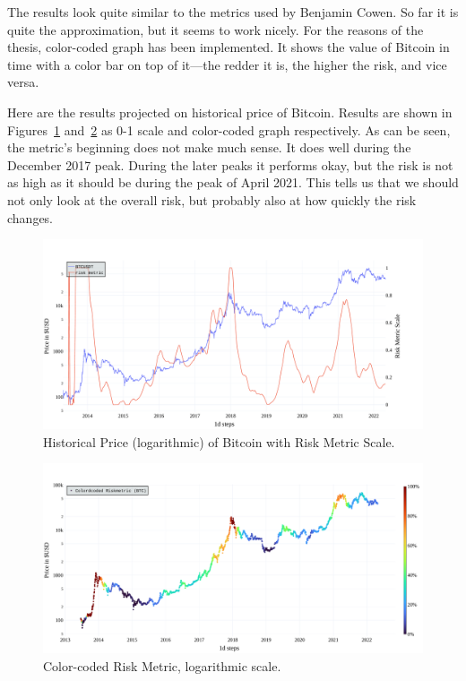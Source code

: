 The results look quite similar to the metrics used by Benjamin Cowen. So far it is quite the approximation, but it seems to work nicely. For the reasons of the thesis, color-coded graph has been implemented. It shows the value of Bitcoin in time with a color bar on top of it---the redder it is, the higher the risk, and vice versa.

Here are the results projected on historical price of Bitcoin. Results are shown in Figures~\ref{figure-50week-scale} and~\ref{figure-50week-colorcoded} as 0-1 scale and color-coded graph respectively. As can be seen, the metric's beginning does not make much sense. It does well during the December 2017 peak. During the later peaks it performs okay, but the risk is not as high as it should be during the peak of April 2021. This tells us that we should not only look at the overall risk, but probably also at how quickly the risk changes.

\begin{figure}[!hbt]
    \centering
    \includegraphics[width=\columnwidth]{figures/50week-scale.pdf}
    \caption{Historical Price (logarithmic) of Bitcoin with Risk Metric Scale.}
    \label{figure-50week-scale}
\end{figure}

\begin{figure}[!hbt]
    \centering
    \includegraphics[width=\columnwidth]{figures/50week-colorcoded.pdf}
    \caption{Color-coded Risk Metric, logarithmic scale.}
    \label{figure-50week-colorcoded}
\end{figure}

